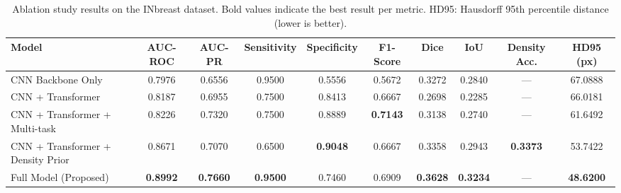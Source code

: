 \begin{table}[t]
\centering
\caption{Ablation study results on the INbreast dataset. Bold values indicate the best result per metric. HD95: Hausdorff 95th percentile distance (lower is better).}
\label{tab:ablation}
\begin{tabular}{lccccccccc}
\toprule
Model & AUC-ROC & AUC-PR & Sensitivity & Specificity & F1-Score & Dice & IoU & Density Acc. & HD95 (px) \\
\midrule
CNN Backbone Only & 0.7976 & 0.6556 & 0.9500 & 0.5556 & 0.5672 & 0.3272 & 0.2840 & — & 67.0888 \\
CNN + Transformer & 0.8187 & 0.6955 & 0.7500 & 0.8413 & 0.6667 & 0.2698 & 0.2285 & — & 66.0181 \\
CNN + Transformer + Multi-task & 0.8226 & 0.7320 & 0.7500 & 0.8889 & \textbf{0.7143} & 0.3138 & 0.2740 & — & 61.6492 \\
CNN + Transformer + Density Prior & 0.8671 & 0.7070 & 0.6500 & \textbf{0.9048} & 0.6667 & 0.3358 & 0.2943 & \textbf{0.3373} & 53.7422 \\
Full Model (Proposed) & \textbf{0.8992} & \textbf{0.7660} & \textbf{0.9500} & 0.7460 & 0.6909 & \textbf{0.3628} & \textbf{0.3234} & — & \textbf{48.6200} \\
\bottomrule
\end{tabular}
\end{table}